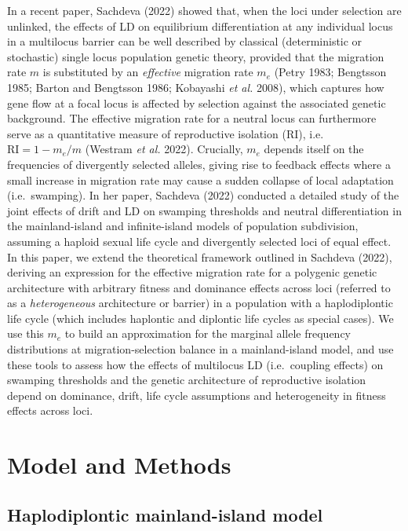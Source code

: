 \documentclass[
  11pt,
]{article}
\begin{document}
In a recent paper, Sachdeva (2022) showed that, when the loci under
selection are unlinked, the effects of LD on equilibrium differentiation
at any individual locus in a multilocus barrier can be well described by
classical (deterministic or stochastic) single locus population genetic
theory, provided that the migration rate \(m\) is substituted by an
\emph{effective} migration rate \(m_e\) (Petry 1983; Bengtsson 1985;
Barton and Bengtsson 1986; Kobayashi \emph{et al.} 2008), which captures
how gene flow at a focal locus is affected by selection against the
associated genetic background. The effective migration rate for a
neutral locus can furthermore serve as a quantitative measure of
reproductive isolation (RI), i.e.~\(\mathrm{RI}= 1-m_e/m\) (Westram
\emph{et al.} 2022). Crucially, \(m_e\) depends itself on the
frequencies of divergently selected alleles, giving rise to feedback
effects where a small increase in migration rate may cause a sudden
collapse of local adaptation (i.e.~swamping). In her paper, Sachdeva
(2022) conducted a detailed study of the joint effects of drift and LD
on swamping thresholds and neutral differentiation in the
mainland-island and infinite-island models of population subdivision,
assuming a haploid sexual life cycle and divergently selected loci of
equal effect. In this paper, we extend the theoretical framework
outlined in Sachdeva (2022), deriving an expression for the effective
migration rate for a polygenic genetic architecture with arbitrary
fitness and dominance effects across loci (referred to as a
\emph{heterogeneous} architecture or barrier) in a population with a
haplodiplontic life cycle (which includes haplontic and diplontic life
cycles as special cases). We use this \(m_e\) to build an approximation
for the marginal allele frequency distributions at migration-selection
balance in a mainland-island model, and use these tools to assess how
the effects of multilocus LD (i.e.~coupling effects) on swamping
thresholds and the genetic architecture of reproductive isolation depend
on dominance, drift, life cycle assumptions and heterogeneity in fitness
effects across loci.

\hypertarget{model-and-methods}{%
\section{Model and Methods}\label{model-and-methods}}

\hypertarget{sec:model}{%
\subsection{Haplodiplontic mainland-island model}\label{sec:model}}
\end{document}

